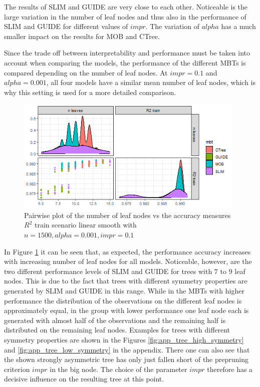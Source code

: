 The results of SLIM and GUIDE are very close to each other. Noticeable is the large variation in the number of leaf nodes and thus also in the performance of SLIM and GUIDE for different values of $impr$. The variation of $alpha$ has a much smaller impact on the results for MOB and CTree.

Since the trade off between interpretability and performance must be taken into account when comparing the models, the performance of the different MBTs is compared depending on the number of leaf nodes. 
At $impr = 0.1$ and $alpha = 0.001$, all four models have a similar mean number of leaf nodes, which is why this setting is used for a more detailed comparison.

\begin{figure}[!htb] 
\centering
    \includegraphics[width=11cm]{Figures/simulations/chapter_5_simulation_study/basic_scenarios/linear_smooth/ls_1000_standalone_r2_nleaves.png}
    \caption{Pairwise plot of the number of leaf nodes vs the accuracy measures $R^2$ train scenario linear smooth with $n=1500, alpha = 0.001, impr = 0.1$}
    \label{fig:ls_1000_standalone_r2_nleaves}
\end{figure} 


In Figure \ref{fig:ls_1000_standalone_r2_nleaves} it can be seen that, as expected, the performance accuracy increases with increasing number of leaf nodes for all models. Noticeable, however, are the two different performance levels of SLIM and GUIDE for trees with $7$ to $9$ leaf nodes. This is due to the fact that trees with different symmetry properties are generated by SLIM and GUIDE in this range. While in the MBTs with higher performance the distribution of the observations on the different leaf nodes is approximately equal, in the group with lower performance one leaf node each is generated with almost half of the observations and the remaining half is distributed on the remaining leaf nodes. Examples for trees with different symmetry properties are shown in the Figures \ref{fig:app_tree_high_symmetry} and \ref{fig:app_tree_low_symmetry} in  the appendix. There one can also see that the shown strongly asymmetric tree has only just fallen short of the prepruning criterion $impr$ in the big node. The choice of the parameter $impr$ therefore has a decisive influence on the resulting tree at this point.





